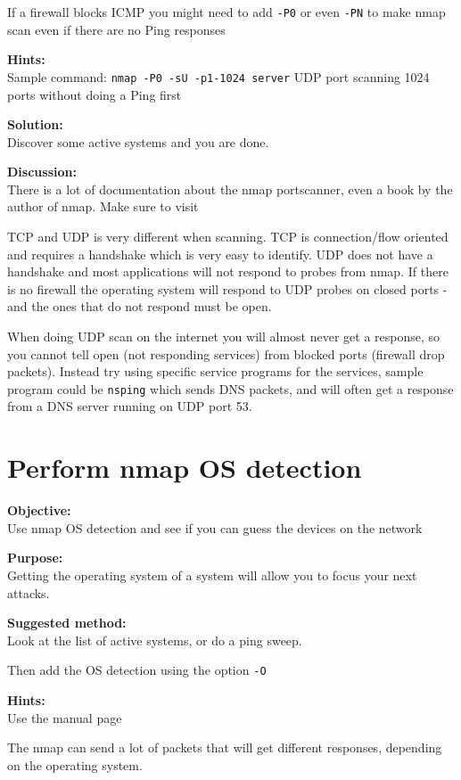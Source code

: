 \documentclass[a4paper,11pt,notitlepage]{report}
\begin{document}
If a firewall blocks ICMP you might need to add \verb+-P0+
or even \verb+-PN+ to make nmap scan even if there are no Ping responses

{\bf Hints:} \\
Sample command: \verb+nmap -P0 -sU -p1-1024 server+ UDP port scanning
1024 ports without doing a Ping first

{\bf Solution:}\\
Discover some active systems and you are done.

{\bf Discussion:}\\
There is a lot of documentation about the nmap portscanner, even a book by the author
of nmap. Make sure to visit 

TCP and UDP is very different when scanning. TCP is connection/flow oriented and requires a handshake which is very easy to identify. UDP does not have a handshake and most applications will not respond to probes from nmap. If there is no firewall the operating system will respond to UDP probes on closed ports - and the ones that do not respond must be open.

When doing UDP scan on the internet you will almost never get a response, so you cannot tell open (not responding services) from blocked ports (firewall drop packets). Instead try using specific service programs for the services, sample program could be \verb+nsping+ which sends DNS packets, and will often get a response from a DNS server running on UDP port 53.

\chapter{Perform nmap OS detection}
\label{ex:nmap-os}

{\bf Objective:} \\
Use nmap OS detection and see if you can guess the devices on the network

{\bf Purpose:}\\
Getting the operating system of a system will allow you to focus your next attacks.

{\bf Suggested method:}\\
Look at the list of active systems, or do a ping sweep.

Then add the OS detection using the option \verb+-O+

{\bf Hints:} \\
Use the manual page

The nmap can send a lot of packets that will get different responses, depending on the operating system.
\end{document}
